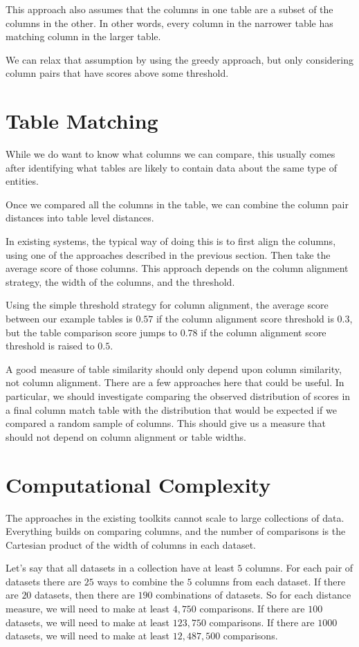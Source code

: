 \documentclass{datamade}
\theoremstyle{definition}
\theoremstyle{remark}
\begin{document}
This approach also assumes that the columns in one table are a subset
of the columns in the other. In other words, every column in the
narrower table has matching column in the larger table.

We can relax that assumption by using the greedy approach, but only
considering column pairs that have scores above some threshold.

\section*{Table Matching}
While we do want to know what columns we can compare, this usually
comes after identifying what tables are likely to contain data about
the same type of entities.

Once we compared all the columns in the table, we can combine the column
pair distances into table level distances.

In existing systems, the typical way of doing this is to first align
the columns, using one of the approaches described in the previous
section. Then take the average score of those columns. This approach
depends on the column alignment strategy, the width of the columns,
and the threshold.

Using the simple threshold strategy for column alignment, the average
score between our example tables is $0.57$ if the column alignment score
threshold is $0.3$, but the table comparison score jumps to $0.78$ if
the column alignment score threshold is raised to $0.5$.

A good measure of table similarity should only depend upon column
similarity, not column alignment. There are a few approaches here that
could be useful. In particular, we should investigate comparing the
observed distribution of scores in a final column match table with the
distribution that would be expected if we compared a random sample of
columns. This should give us a measure that should not depend on
column alignment or table widths.

\section*{Computational Complexity}
The approaches in the existing toolkits cannot scale to large
collections of data. Everything builds on comparing columns, and the
number of comparisons is the Cartesian product of the width of columns
in each dataset.

Let's say that all datasets in a collection have at least $5$ columns. For
each pair of datasets there are $25$ ways to combine the $5$ columns from
each dataset. If there are $20$ datasets, then there are $190$ combinations
of datasets. So for each distance measure, we will need to make at
least $4,750$ comparisons. If there are $100$ datasets, we will need to
make at least $123,750$ comparisons. If there are $1000$ datasets, we
will need to make at least $12,487,500$ comparisons.
\end{document}
